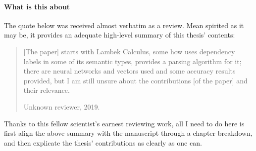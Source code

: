 {{	\paragraph{What is this about}
	The quote below was received almost verbatim as a review.
	Mean spirited as it may be, it provides an adequate high-level summary of this thesis' contents: 
	\begin{quote}
	[The paper] starts with Lambek Calculus, some how uses dependency labels in some of its semantic types, provides a parsing algorithm for it; there are neural networks and vectors used and some accuracy results provided, but I am still unsure about the contributions [of the paper] and their relevance.
	\begin{flushright} Unknown reviewer, 2019.\end{flushright}
	\end{quote}
	
	Thanks to this fellow scientist's earnest reviewing work, all I need to do here is first align the above summary with the manuscript through a chapter breakdown, and then explicate the thesis' contributions as clearly as one can.
}

}
